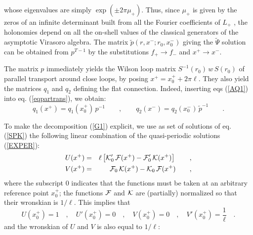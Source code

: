 \documentclass[a4paper,10pt]{article}
\begin{document}
whose eigenvalues are simply $\exp(\pm 2 \pi \mu_+)$.
Thus, since $\mu_+$ is given by the zeros of an infinite determinant
built from all the Fourier coefficients of $L_+$ 
\cite[sec. {\bf 19.4}]{WW}, the holonomies
depend on all the on-shell values of the classical generators of the 
asymptotic Virasoro algebra.
The matrix $\tilde p(r,x^-;r_0,x^-_0)$ giving 
the $\tilde \Psi$ solution can be 
obtained from $p^{T-1}$ by the substitutions $f_+ \rightarrow f_-$ and
$x^+\rightarrow x^-$.

The matrix $p$ immediately yields the Wilson loop matrix
$S^{-1}(r_0) \, w \, S(r_0)$
of parallel transport around close loops, by posing 
$x^+=x^+_0+2 \pi \ell$. They also yield the matrices $q_1$ and $q_2$
defining the flat connection. Indeed, inserting
eqs (\ref{AQ1}) into eq. (\ref{eqpartrans}), we obtain:
\begin{equation}
q_1(x^+)=q_1(x^+_0)\,p^{-1} \qquad , \qquad
q_2(x^-)=q_2(x^-_0)\, \tilde p^{-1}  \qquad .
\end{equation}

To make the decomposition (\ref{G1}) explicit,
we use as set of solutions of eq. (\ref{SPK}) the
following linear combination of the quasi-periodic solutions (\ref{EXPER}):
\begin{eqnarray}
U(x^+)&=& \ell\left[{\cal K}'_0 \, {\cal F}(x^+)- {\cal F}'_0 \, {\cal K}(x^+)
\right]  \qquad ,\\
V(x^+)&=&  {\cal F}_0 \, {\cal K}(x^+)- {\cal K}_0 \, {\cal F}(x^+)
\qquad ,
\end{eqnarray}
where the subscript $0$ indicates that the functions must be taken at an
arbitrary reference point $x_0^+$; the functions $\cal F$ and $\cal K$ are 
(partially) normalized so that their wronskian is $1/ \ell$. This implies that
\begin{equation}
U(x^+_0)=1 \quad , \quad U'(x^+_0)=0 \quad , \quad 
V(x^+_0)=0\quad , \quad V'(x^+_0)=\frac 1 \ell \quad .
\end{equation}
and the 
wronskian of $U$ and $V$ is also equal to $1/\ell$:
\end{document}
